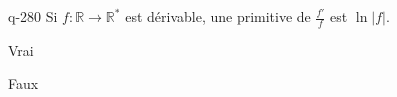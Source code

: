 \begin{truefalse}{q-280}
Si $f : \mathbb R \to \mathbb R^*$ est dérivable, une primitive de $\frac{f'}{f}$ est $\ln |f|$.
\item* Vrai
\item Faux
\end{truefalse}

